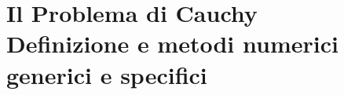 \part[Il Problema di Cauchy]
    {Il Problema di Cauchy\\[\bigskipamount] 
      \large Definizione e metodi numerici generici e specifici}